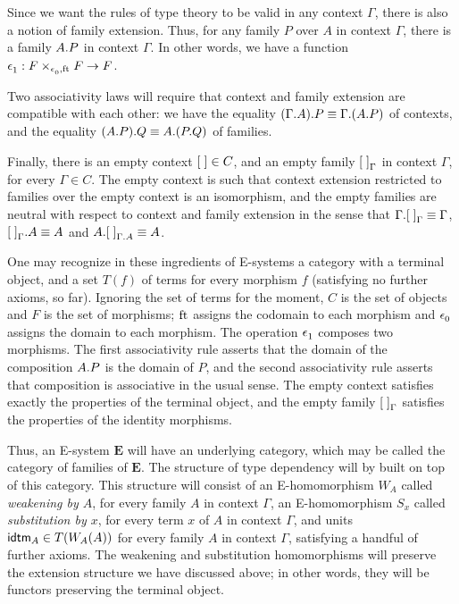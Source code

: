 \documentclass{article}
\begin{document}
Since we want the rules of
type theory to be valid in any context $\Gamma$, there is also a notion of family
extension. Thus, for any family $P$ over $A$ in context $\Gamma$, there is a
family $\ctxext{A}{P}$ in context $\Gamma$. In other words, we have a function
$\epsilon_{1}^{} : F\times_{\epsilon_{0}^{},\mathrm{ft}_{}} F\to F$. 

Two associativity laws will require
that context and family extension are compatible with each other: we have
the equality $\ctxext{{\Gamma}{A}}{P}\jdeq\ctxext{\Gamma}{{A}{P}}$ of contexts,
and the equality $\ctxext{{A}{P}}{Q}\jdeq\ctxext{A}{{P}{Q}}$ of families.

Finally, there is an empty context ${[\;]}\in C$, and an empty family ${[\;]}_{\Gamma}$
in context $\Gamma$, for every $\Gamma\in C$. The empty context is such that context extension
restricted to families over the empty context is an isomorphism, and the empty
families are neutral with respect to context and family extension in the sense
that $\ctxext{\Gamma}{\emptyf[\Gamma]}\jdeq\Gamma$, $\ctxext{\emptyf[\Gamma]}{A}
\jdeq A$ and $\ctxext{A}{\emptyf[\ctxext{\Gamma}{A}]}\jdeq A$. 

One may recognize in these ingredients of E-systems a category with a
terminal object, and a set $T(f)$ of terms for every morphism $f$ (satisfying
no further axioms, so far). Ignoring the set of terms for the moment, $C$ is
the set of objects and $F$ is the set of morphisms; $\mathrm{ft}_{}$ assigns the codomain
to each morphism and $\epsilon_{0}^{}$ assigns the domain to each  morphism. The
operation $\epsilon_{1}^{}$ composes two morphisms. The first associativity rule
asserts that the domain of the composition $\ctxext{A}{P}$ is the domain of
$P$, and the second associativity rule asserts that composition is associative
in the usual sense. The empty context satisfies exactly the properties of the
terminal object, and the empty family ${[\;]}_{\Gamma}$ satisfies the properties
of the identity morphisms. 

Thus, an E-system $\mathbf{E}$ will have an underlying category, which may be called the
category of families of $\mathbf{E}$. The structure of type dependency will by
built on top of this category. This structure will consist of an E-homomorphism
$W_A$ called \emph{weakening by $A$}, for every family $A$ in context $\Gamma$,
an E-homomorphism $S_x$ called \emph{substitution by $x$}, for every term
$x$ of $A$ in context $\Gamma$, and units $\idtm{A}\in T(W_A(A))$ for every
family $A$ in context $\Gamma$, satisfying a handful of further axioms. 
The weakening and substitution homomorphisms
will preserve the extension structure we have discussed above; in other words,
they will be functors preserving the terminal object. 
\end{document}
